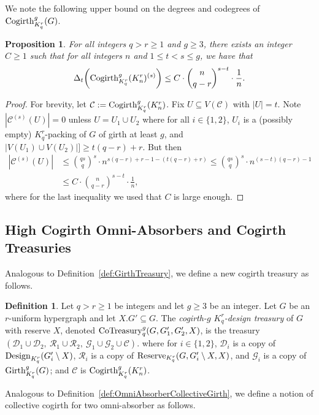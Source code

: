 \documentclass[11pt]{article}
\newcommand{\mc}[1]{\mathcal{#1}}
\newcounter{i}
\theoremstyle{plain}
\newtheorem{proposition}[thm]{Proposition}
\theoremstyle{plain} %
\theoremstyle{definition}
\newtheorem{definition}[thm]{Definition}
\begin{document}
We note the following upper bound on the degrees and codegrees of ${\rm Cogirth}_{K_q^r}^g(G)$. 

\begin{proposition}\label{prop:CogirthDegrees}
For all integers $q> r\ge 1$ and $g\ge 3$, there exists an integer $C\ge 1$ such that for all integers $n$ and $1\le t < s \le g$, we have that 
$$\Delta_{t}\bigg({\rm Cogirth}_{K_q^r}^g(K_n^r)^{(s)}\bigg)\le C\cdot \binom{n}{q-r}^{s-t} \cdot \frac{1}{n}.$$
\end{proposition}
\begin{proof}
For brevity, let $\mc{C}:= {\rm Cogirth}_{K_q^r}^g(K_n^r)$. Fix $U\subseteq V(\mc{C})$ with $|U|=t$. Note $|\mc{C}^{(s)}(U)|=0$ unless $U=U_1\cup U_2$ where for all $i\in \{1,2\}$, $U_i$ is a (possibly empty) $K_q^r$-packing of $G$ of girth at least $g$, and $|V(U_1)\cup V(U_2)| ]\ge t(q-r)+r$. But then
\begin{align*}
|\mc{C}^{(s)}(U)| &\le \binom{qs}{q}^s \cdot n^{s(q-r)+r-1 - (t(q-r)+r)} \le  \binom{qs}{q}^s \cdot n^{(s-t)(q-r)-1}\\
&\le C\cdot \binom{n}{q-r}^{s-t} \cdot \frac{1}{n},
\end{align*}
where for the last inequality we used that $C$ is large enough.
\end{proof}

\subsection{High Cogirth Omni-Absorbers and Cogirth Treasuries}

Analogous to Definition~\ref{def:GirthTreasury}, we define a new cogirth treasury as follows.

\begin{definition}
Let $q > r \ge 1$ be integers and let $g\ge 3$ be an integer. Let $G$ be an $r$-uniform hypergraph and let $X.G'\subseteq G$. The \emph{cogirth-$g$ $K_q^r$-design treasury} of $G$ with reserve $X$, denoted ${\rm CoTreasury}_q^g(G,G_1',G_2',X)$, is the treasury $(\mc{D}_1\cup \mc{D}_2,~ \mc{R}_1\cup \mc{R}_2,~\mc{G}_1\cup \mc{G}_2\cup \mc{C})$.
where for $i\in\{1,2\}$, $\mc{D}_i$ is a copy of ${\rm Design}_{K_q^r}(G_i'\setminus X)$, $\mc{R}_i$ is a copy of ${\rm Reserve}_{K_q^r}(G, G_i'\setminus X, X)$, and $\mc{G}_i$ is a copy of ${\rm Girth}_{K_q^r}^g(G)$; and $\mc{C}$ is ${\rm Cogirth}_{K_q^r}^g(K_n^r)$.
\end{definition}

Analogous to Definition~\ref{def:OmniAbsorberCollectiveGirth}, we define a notion of collective cogirth for two omni-absorber as follows.
\end{document}
